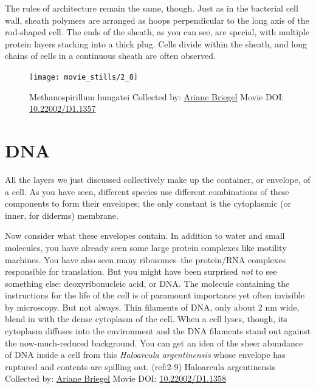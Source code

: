 \documentclass[]{tufte-book}
\begin{document}
The rules of architecture remain the same, though. Just as in the
bacterial cell wall, sheath polymers are arranged as hoops perpendicular
to the long axis of the rod-shaped cell. The ends of the sheath, as you
can see, are special, with multiple protein layers stacking into a thick
plug. Cells divide within the sheath, and long chains of cells in a
continuous sheath are often observed.





\begin{figure}
\texttt{[image: movie\_stills/2\_8]} \caption[Methanospirillum hungatei Collected by:
\protect\hyperlink{ariane_briegel}{Ariane Briegel} Movie DOI:
\href{https://doi.org/10.22002/D1.1357}{10.22002/D1.1357}]{Methanospirillum hungatei Collected by:
\protect\hyperlink{ariane_briegel}{Ariane Briegel} Movie DOI:
\href{https://doi.org/10.22002/D1.1357}{10.22002/D1.1357}}\label{fig:2-8}
\end{figure}

\section{DNA}\label{dna}

All the layers we just discussed collectively make up the container, or
envelope, of a cell. As you have seen, different species use different
combinations of these components to form their envelopes; the only
constant is the cytoplasmic (or inner, for diderms) membrane.

Now consider what these envelopes contain. In addition to water and
small molecules, you have already seen some large protein complexes like
motility machines. You have also seen many ribosomes--the protein/RNA
complexes responsible for translation. But you might have been surprised
\emph{not} to see something else: deoxyribonucleic acid, or DNA. The
molecule containing the instructions for the life of the cell is of
paramount importance yet often invisible by microscopy. But not always.
Thin filaments of DNA, only about 2 nm wide, blend in with the dense
cytoplasm of the cell. When a cell lyses, though, its cytoplasm diffuses
into the environment and the DNA filaments stand out against the
now-much-reduced background. You can get an idea of the sheer abundance
of DNA inside a cell from this \emph{Haloarcula argentinensis} whose
envelope has ruptured and contents are spilling out. (ref:2-9)
Haloarcula argentinensis Collected by:
\protect\hyperlink{ariane_briegel}{Ariane Briegel} Movie DOI:
\href{https://doi.org/10.22002/D1.1358}{10.22002/D1.1358}
\end{document}

